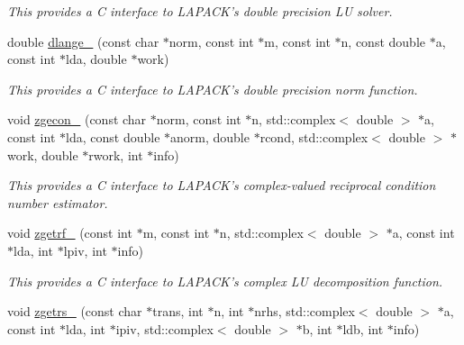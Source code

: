 \begin{DoxyCompactItemize}
\begin{DoxyCompactList}\small\item\em This provides a C interface to L\-A\-P\-A\-C\-K's double precision L\-U solver. \end{DoxyCompactList}\item 
\hypertarget{namespacekeycpp_a4507ef954be960fec70ca0f93258d730}{double \hyperlink{namespacekeycpp_a4507ef954be960fec70ca0f93258d730}{dlange\-\_\-} (const char $\ast$norm, const int $\ast$m, const int $\ast$n, const double $\ast$a, const int $\ast$lda, double $\ast$work)}\label{namespacekeycpp_a4507ef954be960fec70ca0f93258d730}

\begin{DoxyCompactList}\small\item\em This provides a C interface to L\-A\-P\-A\-C\-K's double precision norm function. \end{DoxyCompactList}\item 
\hypertarget{namespacekeycpp_a444e3cdc7e7929414370b6b50ea1218c}{void \hyperlink{namespacekeycpp_a444e3cdc7e7929414370b6b50ea1218c}{zgecon\-\_\-} (const char $\ast$norm, const int $\ast$n, std\-::complex$<$ double $>$ $\ast$a, const int $\ast$lda, const double $\ast$anorm, double $\ast$rcond, std\-::complex$<$ double $>$ $\ast$work, double $\ast$rwork, int $\ast$info)}\label{namespacekeycpp_a444e3cdc7e7929414370b6b50ea1218c}

\begin{DoxyCompactList}\small\item\em This provides a C interface to L\-A\-P\-A\-C\-K's complex-\/valued reciprocal condition number estimator. \end{DoxyCompactList}\item 
\hypertarget{namespacekeycpp_ab18d58d53d8e19a37d74d24da27a64dd}{void \hyperlink{namespacekeycpp_ab18d58d53d8e19a37d74d24da27a64dd}{zgetrf\-\_\-} (const int $\ast$m, const int $\ast$n, std\-::complex$<$ double $>$ $\ast$a, const int $\ast$lda, int $\ast$lpiv, int $\ast$info)}\label{namespacekeycpp_ab18d58d53d8e19a37d74d24da27a64dd}

\begin{DoxyCompactList}\small\item\em This provides a C interface to L\-A\-P\-A\-C\-K's complex L\-U decomposition function. \end{DoxyCompactList}\item 
\hypertarget{namespacekeycpp_abbe4322276dcdb7d864e85854b5b90f2}{void \hyperlink{namespacekeycpp_abbe4322276dcdb7d864e85854b5b90f2}{zgetrs\-\_\-} (const char $\ast$trans, int $\ast$n, int $\ast$nrhs, std\-::complex$<$ double $>$ $\ast$a, const int $\ast$lda, int $\ast$ipiv, std\-::complex$<$ double $>$ $\ast$b, int $\ast$ldb, int $\ast$info)}\label{namespacekeycpp_abbe4322276dcdb7d864e85854b5b90f2}


\end{DoxyCompactItemize}
